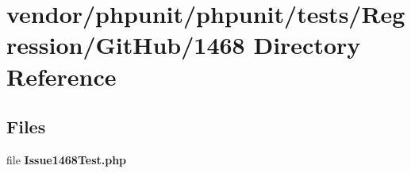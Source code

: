 \section{vendor/phpunit/phpunit/tests/\+Regression/\+Git\+Hub/1468 Directory Reference}
\label{dir_6a2bbd8a1ddf18aa0a151ef3eca1911a}
\subsection*{Files}
\begin{DoxyCompactItemize}
\item 
file {\bf Issue1468\+Test.\+php}
\end{DoxyCompactItemize}
